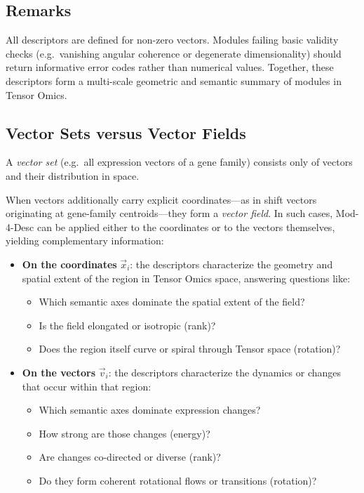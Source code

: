     \subsection*{Remarks}

        All descriptors are defined for non-zero vectors.
        Modules failing basic validity checks (e.g.\ vanishing angular coherence or
        degenerate dimensionality) should return informative error codes rather than
        numerical values.
        Together, these descriptors form a multi-scale geometric and semantic summary of
        modules in Tensor Omics.

    \subsection{Vector Sets versus Vector Fields}

        A \textit{vector set} (e.g.\ all expression vectors of a gene family) consists 
        only of vectors and their distribution in space.  

        When vectors additionally carry explicit coordinates---as in shift vectors
        originating at gene-family centroids---they form a \textit{vector field}.  In
        such cases, Mod-4-Desc can be applied either to the coordinates or to the
        vectors themselves, yielding complementary information:

    \begin{itemize}
        \item \textbf{On the coordinates} $\vec{x}_i$:  
        the descriptors characterize the geometry and spatial extent of the region 
        in Tensor Omics space, answering questions like:
        \begin{itemize}
            \item Which semantic axes dominate the spatial extent of the field?
            \item Is the field elongated or isotropic (rank)?
            \item Does the region itself curve or spiral through Tensor space (rotation)?
        \end{itemize}

        \item \textbf{On the vectors} $\vec{v}_i$:  
        the descriptors characterize the dynamics or changes that occur within that region:
        \begin{itemize}
            \item Which semantic axes dominate expression changes?
            \item How strong are those changes (energy)?
            \item Are changes co-directed or diverse (rank)?
            \item Do they form coherent rotational flows or transitions (rotation)?
        \end{itemize}

    \end{itemize}

